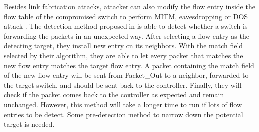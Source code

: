 Besides link fabrication attacks, attacker can also modify the flow entry inside the flow table of the compromised switch to perform MITM, eavesdropping or DOS attack \cite{AAS14}. The detection method proposed in \cite{CKGL15} is able to detect whether a switch is forwarding the packets in an unexpected way. After selecting a flow entry as the detecting target, they install new entry on its neighbors. With the match field selected by their algorithm, they are able to let every packet that matches the new flow entry matches the target flow entry. A packet containing the match field of the new flow entry will be sent from Packet\_Out to a neighbor, forwarded to the target switch, and should be sent back to the controller. Finally, they will check if the packet comes back to the controller as expected and remain unchanged. However, this method will take a longer time to run if lots of flow entries to be detect. Some pre-detection method to narrow down the potential target is needed.
